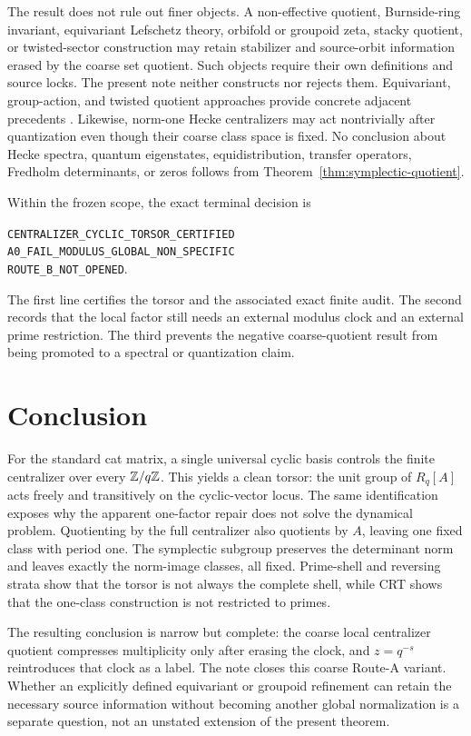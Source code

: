 \documentclass[11pt]{article}
\theoremstyle{definition}
\theoremstyle{remark}
\newcommand{\classification}{\texttt{CENTRALIZER\_CYCLIC\_TORSOR\_CERTIFIED}}
\newcommand{\routea}{\texttt{A0\_FAIL\_MODULUS\_GLOBAL\_NON\_SPECIFIC}}
\newcommand{\routeb}{\texttt{ROUTE\_B\_NOT\_OPENED}}
\begin{document}
The result does not rule out finer objects.  A non-effective quotient,
Burnside-ring invariant, equivariant Lefschetz theory, orbifold or groupoid
zeta, stacky quotient, or twisted-sector construction may retain stabilizer
and source-orbit information erased by the coarse set quotient.  Such
objects require their own definitions and source locks.  The present note
neither constructs nor rejects them.  Equivariant, group-action, and twisted
quotient approaches provide concrete adjacent precedents
\citep{GuseinZadeLuengoMelle2015,Miles2017,Walton2018}.  Likewise, norm-one Hecke
centralizers may act nontrivially after quantization even though their coarse
class space is fixed.  No conclusion about Hecke spectra, quantum
eigenstates, equidistribution, transfer operators, Fredholm determinants, or
zeros follows from Theorem~\ref{thm:symplectic-quotient}.

Within the frozen scope, the exact terminal decision is
\begin{center}
\small
\classification\\[2pt]
\routea\\[2pt]
\routeb.
\end{center}
The first line certifies the torsor and the associated exact finite audit.
The second records that the local factor still needs an external modulus
clock and an external prime restriction.  The third prevents the negative
coarse-quotient result from being promoted to a spectral or quantization
claim.

\section{Conclusion}
\label{sec:conclusion}

For the standard cat matrix, a single universal cyclic basis controls the
finite centralizer over every \(\mathbb{Z}/q\mathbb{Z}\).  This yields a clean torsor: the
unit group of \(R_q[A]\) acts freely and transitively on the cyclic-vector
locus.  The same identification exposes why the apparent one-factor repair
does not solve the dynamical problem.  Quotienting by the full centralizer
also quotients by \(A\), leaving one fixed class with period one.  The
symplectic subgroup preserves the determinant norm and leaves exactly the
norm-image classes, all fixed.  Prime-shell and reversing strata show that
the torsor is not always the complete shell, while CRT shows that the
one-class construction is not restricted to primes.

The resulting conclusion is narrow but complete: the coarse local
centralizer quotient compresses multiplicity only after erasing the clock,
and \(z=q^{-s}\) reintroduces that clock as a label.  The note closes this
coarse Route-A variant.  Whether an explicitly defined equivariant or
groupoid refinement can retain the necessary source information without
becoming another global normalization is a separate question, not an
unstated extension of the present theorem.
\end{document}
